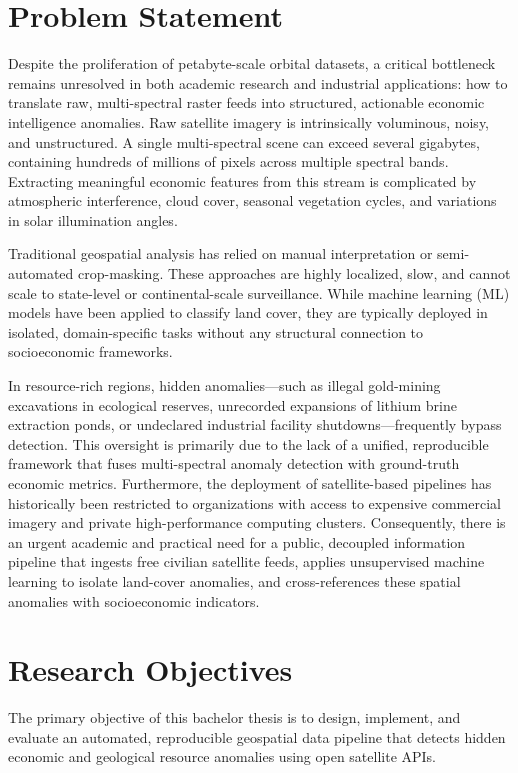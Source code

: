 \section{Problem Statement}
Despite the proliferation of petabyte-scale orbital datasets, a critical bottleneck remains unresolved in both academic research and industrial applications: how to translate raw, multi-spectral raster feeds into structured, actionable economic intelligence anomalies. Raw satellite imagery is intrinsically voluminous, noisy, and unstructured. A single multi-spectral scene can exceed several gigabytes, containing hundreds of millions of pixels across multiple spectral bands. Extracting meaningful economic features from this stream is complicated by atmospheric interference, cloud cover, seasonal vegetation cycles, and variations in solar illumination angles. 

Traditional geospatial analysis has relied on manual interpretation or semi-automated crop-masking. These approaches are highly localized, slow, and cannot scale to state-level or continental-scale surveillance. While machine learning (ML) models have been applied to classify land cover, they are typically deployed in isolated, domain-specific tasks without any structural connection to socioeconomic frameworks. 

In resource-rich regions, hidden anomalies—such as illegal gold-mining excavations in ecological reserves, unrecorded expansions of lithium brine extraction ponds, or undeclared industrial facility shutdowns—frequently bypass detection. This oversight is primarily due to the lack of a unified, reproducible framework that fuses multi-spectral anomaly detection with ground-truth economic metrics. Furthermore, the deployment of satellite-based pipelines has historically been restricted to organizations with access to expensive commercial imagery and private high-performance computing clusters. Consequently, there is an urgent academic and practical need for a public, decoupled information pipeline that ingests free civilian satellite feeds, applies unsupervised machine learning to isolate land-cover anomalies, and cross-references these spatial anomalies with socioeconomic indicators.

\section{Research Objectives}
The primary objective of this bachelor thesis is to design, implement, and evaluate an automated, reproducible geospatial data pipeline that detects hidden economic and geological resource anomalies using open satellite APIs. 

